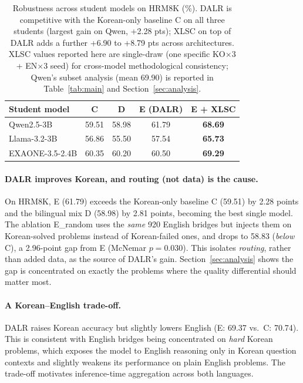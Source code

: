 \documentclass{article}
\begin{document}
\begin{table}[h]
\centering
\small
\begin{tabular}{lcccc}
\toprule
\textbf{Student model} & \textbf{C} & \textbf{D} & \textbf{E (DALR)} & \textbf{E + XLSC} \\
\midrule
Qwen2.5-3B      & 59.51 & 58.98 & 61.79 & \textbf{68.69} \\
Llama-3.2-3B    & 56.86 & 55.50 & 57.54 & \textbf{65.73} \\
EXAONE-3.5-2.4B & 60.35 & 60.20 & 60.50 & \textbf{69.29} \\
\bottomrule
\end{tabular}
\caption{Robustness across student models on HRM8K (\%). DALR is
competitive with the Korean-only baseline C on all three students
(largest gain on Qwen, +2.28 pts); XLSC on top of DALR adds a further
+6.90 to +8.79 pts across architectures. XLSC values reported here
are single-draw (one specific KO$\times$3 + EN$\times$3 seed) for
cross-model methodological consistency; Qwen's subset analysis
(mean 69.90) is reported in Table~\ref{tab:main} and
Section~\ref{sec:analysis}.}
\label{tab:robustness}
\end{table}

\paragraph{DALR improves Korean, and routing (not data) is the cause.}
On HRM8K, E (61.79) exceeds the Korean-only baseline C (59.51) by
2.28 points and the bilingual mix D (58.98) by 2.81 points, becoming
the best single model. The ablation E\_random uses the \emph{same}
920 English bridges but injects them on Korean-solved problems
instead of Korean-failed ones, and drops to 58.83 (\emph{below} C),
a 2.96-point gap from E (McNemar $p=0.030$). This isolates
\emph{routing}, rather than added data, as the source of DALR's gain.
Section~\ref{sec:analysis} shows the gap is concentrated on exactly
the problems where the quality differential should matter most.

\paragraph{A Korean--English trade-off.}
DALR raises Korean accuracy but slightly lowers English (E: 69.37
vs.\ C: 70.74). This is consistent with English bridges being
concentrated on \emph{hard} Korean problems, which exposes the model
to English reasoning only in Korean question contexts and slightly
weakens its performance on plain English problems. The trade-off
motivates inference-time aggregation across both languages.
\end{document}
